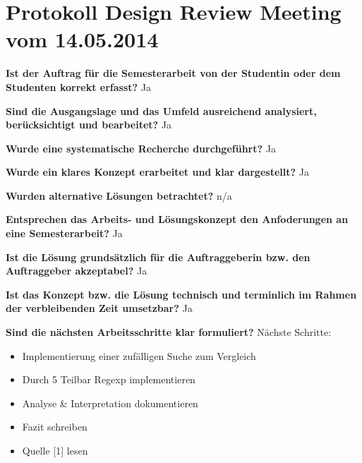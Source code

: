 \section{Protokoll Design Review Meeting vom 14.05.2014}
\textbf{Ist der Auftrag für die Semesterarbeit von der Studentin oder dem Studenten korrekt erfasst?}\newline 
Ja

\textbf{Sind die Ausgangslage und das Umfeld ausreichend analysiert, berücksichtigt und bearbeitet?}\newline 
Ja

\textbf{Wurde eine systematische Recherche durchgeführt?}\newline 
Ja

\textbf{Wurde ein klares Konzept erarbeitet und klar dargestellt?}\newline 
Ja

\textbf{Wurden alternative Lösungen betrachtet?}\newline 
n/a

\textbf{Entsprechen das Arbeits- und Lösungskonzept den Anfoderungen an eine Semesterarbeit?}\newline 
Ja

\textbf{Ist die Lösung grundsätzlich für die Auftraggeberin bzw. den Auftraggeber akzeptabel?}\newline 
Ja

\textbf{Ist das Konzept bzw. die Lösung technisch und terminlich im Rahmen der verbleibenden Zeit umsetzbar?}\newline 
Ja

\textbf{Sind die nächsten Arbeitsschritte klar formuliert?}\newline 
Nächste Schritte:\\
\begin{itemize}
	\item Implementierung einer zufälligen Suche zum Vergleich
	\item Durch 5 Teilbar Regexp implementieren
	\item Analyse \& Interpretation dokumentieren
	\item Fazit schreiben
	\item Quelle [1] lesen
\end{itemize}